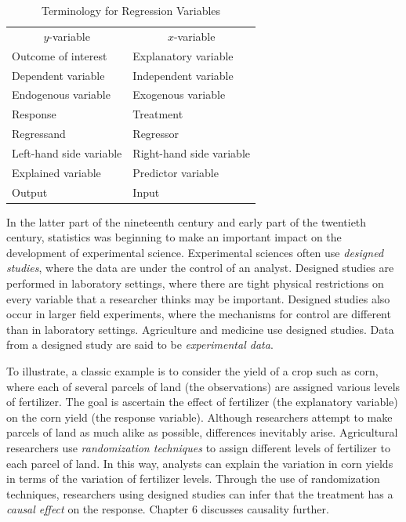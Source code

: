 \begin{table}[h] 
\caption{\label{T1:RegressionTerms} Terminology for Regression
Variables}
\begin{tabular}{ll}
\hline \multicolumn{1}{c}{$y$-variable} & \multicolumn{1}{c}{$x$-variable} \\
Outcome of interest & Explanatory variable \\
Dependent variable & Independent variable \\
Endogenous variable & Exogenous variable \\
Response & Treatment \\
Regressand & Regressor \\
Left-hand side variable & Right-hand side variable \\
Explained variable & Predictor variable \\
Output & Input \\
 \hline
\end{tabular}\end{table}



In the latter part of the nineteenth century and early part of the
twentieth century, statistics was beginning to make an important
impact on the development of experimental science. Experimental
sciences often use \emph{designed studies}, where the data are under
the control of an analyst. Designed studies are performed in
laboratory settings, where there are tight physical restrictions on
every variable that a researcher thinks may be important. Designed
studies also occur in larger field experiments, where the mechanisms
for control are different than in laboratory settings. Agriculture
and medicine use designed studies. Data from a designed study are
said to be \emph{experimental data}.


To illustrate, a classic example is to consider the yield of a crop
such as corn, where each of several parcels of land (the
observations) are assigned various levels of fertilizer. The goal is
ascertain the effect of fertilizer (the explanatory variable) on the
corn yield (the response variable). Although researchers attempt to
make parcels of land as much alike as possible, differences
inevitably arise. Agricultural researchers use \emph{randomization
techniques} to assign different levels of fertilizer to each parcel
of land. In this way, analysts can explain the variation in corn
yields in terms of the variation of fertilizer levels. Through the
use of randomization techniques, researchers using designed studies
can infer that the treatment has a \emph{causal effect} on the
response. Chapter 6 discusses causality further.

